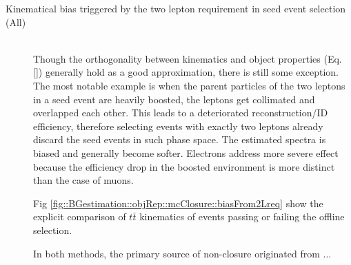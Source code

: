 \begin{description}
\item [Kinematical bias triggered by the two lepton requirement in seed event selection (All)] \mbox{} \\
Though the orthogonality between kinematics and object properties (Eq. \ref{}) generally hold as a good approximation, there is still some exception. The most notable example is when the parent particles of the two leptons in a seed event are heavily boosted, the leptons get collimated and overlapped each other. This leads to a deteriorated reconstruction/ID efficiency, therefore selecting events with exactly two leptons already discard the seed events in such phase space. 
The estimated spectra is biased and generally become softer. Electrons address more severe effect because the efficiency drop in the boosted environment is more distinct than the case of muons.

Fig \ref{fig::BGestimation::objRep::mcClosure::biasFrom2Lreq} show the explicit comparison of $t\bar{t}$ kinematics of events passing or failing the offline selection.

In both methods, the primary source of non-closure originated from ...
\begin{figure}[h]
  \centering


\end{figure}
\end{description}
